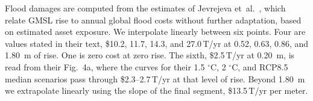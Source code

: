 \documentclass[12pt]{article}
\begin{document}
Flood damages are computed from the estimates of Jevrejeva et~al.~\citeyearpar{Jevrejeva2018}, which relate GMSL rise to annual global flood costs without further adaptation, based on estimated asset exposure. We interpolate linearly between six points. Four are values stated in their text, \$10.2, 11.7, 14.3, and 27.0\,T/yr at 0.52, 0.63, 0.86, and 1.80~m of rise. One is zero cost at zero rise. The sixth, \$2.5\,T/yr at 0.20~m, is read from their Fig.~4a, where the curves for their 1.5 $^\circ$C, 2 $^\circ$C, and RCP8.5 median scenarios pass through \$2.3--2.7\,T/yr at that level of rise. Beyond 1.80~m we extrapolate linearly using the slope of the final segment, \$13.5\,T/yr per meter.






\end{document}
